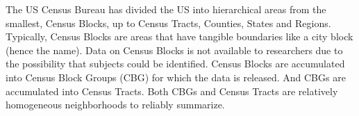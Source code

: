 \documentclass[12pt,answers]{exam}
\begin{document}
\begin{questions}

\pagebreak

\question The US Census Bureau has divided the US into hierarchical
areas from the smallest, Census Blocks, up to Census Tracts, Counties,
States and Regions.  Typically, Census Blocks are areas that have
tangible boundaries like a city block (hence the name).  Data on
Census Blocks is not available to researchers due to the possibility
that subjects could be identified.  Census Blocks are accumulated into
Census Block Groups (CBG) for which the data is released.  And CBGs
are accumulated into Census Tracts.  Both CBGs and Census Tracts are
relatively homogeneous neighborhoods to reliably summarize.
\begin{parts}

\end{parts}
\end{questions}
\end{document}
